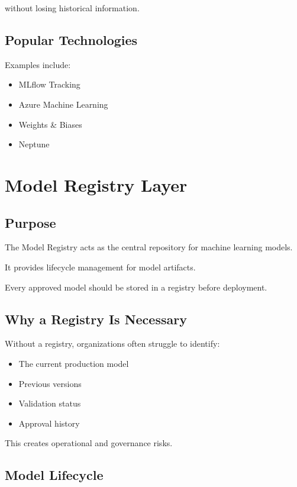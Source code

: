 without losing historical information.

\subsection{Popular Technologies}

Examples include:

\begin{itemize}
    \item MLflow Tracking
    \item Azure Machine Learning
    \item Weights \& Biases
    \item Neptune
\end{itemize}

\section{Model Registry Layer}

\subsection{Purpose}

The Model Registry acts as the central repository for machine learning models.

It provides lifecycle management for model artifacts.

Every approved model should be stored in a registry before deployment.

\subsection{Why a Registry Is Necessary}

Without a registry, organizations often struggle to identify:

\begin{itemize}
    \item The current production model
    \item Previous versions
    \item Validation status
    \item Approval history
\end{itemize}

This creates operational and governance risks.

\subsection{Model Lifecycle}

